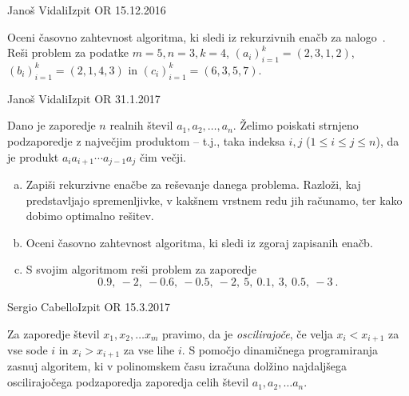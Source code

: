 \begin{naloga}{Janoš Vidali}{Izpit OR 15.12.2016}
\begin{vprasanje}
Oceni časovno zahtevnost algoritma,
ki sledi iz rekurzivnih enačb za nalogo~.
Reši problem za podatke $m = 5, n = 3, k = 4$,
$(a_i)_{i=1}^k = (2, 3, 1, 2)$, $(b_i)_{i=1}^k = (2, 1, 4, 3)$
in $(c_i)_{i=1}^k = (6, 3, 5, 7)$.
\end{vprasanje}
\begin{odgovor}
\end{odgovor}
\end{naloga}


\begin{naloga}{Janoš Vidali}{Izpit OR 31.1.2017}
\begin{vprasanje}
Dano je zaporedje $n$ realnih števil $a_1, a_2, \dots, a_n$.
Želimo poiskati strnjeno podzaporedje z največjim produktom
-- t.j., taka indeksa $i, j$ ($1 \le i \le j \le n$),
da je produkt $a_i a_{i+1} \cdots a_{j-1} a_j$ čim večji.

\begin{enumerate}[(a)]
\item Zapiši rekurzivne enačbe za reševanje danega problema.
Razloži, kaj pred\-stav\-lja\-jo spremenljivke,
v kakšnem vrstnem redu jih računamo,
ter kako dobimo optimalno rešitev.

\item Oceni časovno zahtevnost algoritma, ki sledi iz zgoraj zapisanih enačb.

\item S svojim algoritmom reši problem za zaporedje
$$
0.9, \ -2, \ -0.6, \ -0.5, \ -2, \ 5, \ 0.1, \ 3, \ 0.5, \ -3 \ .
$$
\end{enumerate}
\end{vprasanje}
\begin{odgovor}
\end{odgovor}
\end{naloga}


\begin{naloga}{Sergio Cabello}{Izpit OR 15.3.2017}
\begin{vprasanje}
Za zaporedje števil $x_1, x_2, \dots x_m$ pravimo, da je {\em oscilirajoče},
če velja $x_i < x_{i+1}$ za vse sode $i$ in $x_i > x_{i+1}$ za vse lihe $i$.
S pomočjo dinamičnega programiranja zasnuj algoritem,
ki v polinomskem času izračuna dolžino najdaljšega oscilirajočega podzaporedja
zaporedja celih števil $a_1, a_2, \dots a_n$.
\end{vprasanje}
\begin{odgovor}
\end{odgovor}
\end{naloga}


